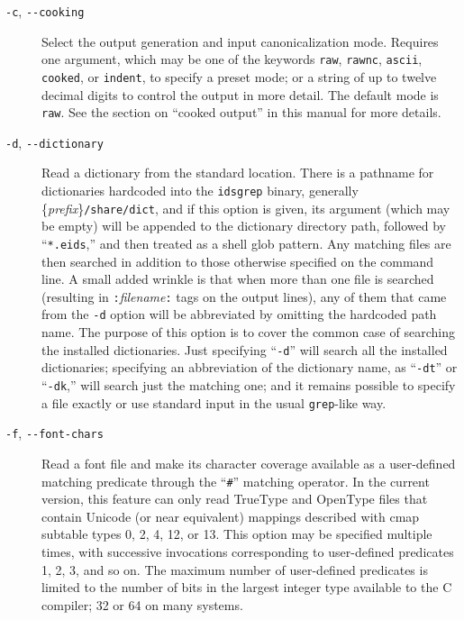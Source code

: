 \documentclass[twocolumn]{report}
\begin{document}
\begin{description}

\item[\texttt{-c}, \texttt{-{}-cooking}]
Select the output generation and input canonicalization mode.  Requires one
argument, which may be one of the keywords \texttt{raw}, \texttt{rawnc},
\texttt{ascii}, \texttt{cooked}, or \texttt{indent}, to specify a preset
mode; or a string of up to twelve decimal digits to control the output in
more detail.  The default mode is \texttt{raw}.  See the
section on ``cooked output'' in this manual for more details.

\item[\texttt{-d}, \texttt{-{}-dictionary}]
Read a dictionary
from the standard location.  There is a pathname for dictionaries hardcoded
into the \texttt{idsgrep} binary, generally
\{\emph{prefix}\}\texttt{/share/dict}, and if this option is given, its
argument (which may be empty) will be appended to the dictionary directory
path, followed by ``\texttt{*.eids},'' and then treated as a shell glob
pattern.  Any matching files are then searched in addition to those
otherwise specified on the command line.  A small added wrinkle is that when
more than one file is searched (resulting in
\texttt{:}\textit{filename}\texttt{:} tags on the output lines), any of them
that came from the \texttt{-d} option will be abbreviated by omitting the
hardcoded path name.  The purpose of this option is to cover the common case
of searching the installed dictionaries.  Just specifying ``\texttt{-d}''
will search all the installed dictionaries; specifying an abbreviation of
the dictionary name, as ``\texttt{-dt}'' or ``\texttt{-dk},'' will search
just the matching one; and it remains possible to specify a file exactly or
use standard input in the usual \texttt{grep}-like way.

\item[\texttt{-f}, \texttt{-{}-font-chars}]
Read a font file and make its character coverage available as a user-defined
matching predicate through the ``\texttt{\#}'' matching operator.  In the
current version, this feature can only read TrueType and OpenType files that
contain Unicode (or near equivalent) mappings described with cmap subtable
types 0, 2, 4, 12, or 13.  This option may be specified multiple times, with
successive invocations corresponding to user-defined predicates 1, 2, 3, and
so on.  The maximum number of user-defined predicates is limited to the
number of bits in the largest integer type available to the C compiler; 32
or 64 on many systems.


\end{description}
\end{document}

